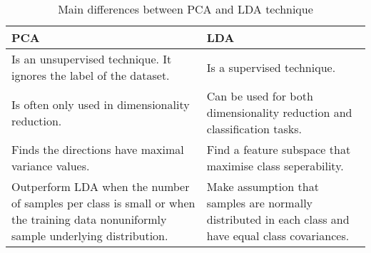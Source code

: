 \begin{table}[!th]
	\centering
	
	\begin{tabularx}{1.0\textwidth}{ XX }
	
	\toprule
	\textbf{PCA} & \textbf{LDA} \\
	
	\midrule

	\tabitem Is an unsupervised technique. It ignores the label of the dataset. & \tabitem Is a supervised technique. \\
	\tabitem Is often only used in dimensionality reduction. & \tabitem Can be used for both dimensionality reduction and classification tasks. \\
	\tabitem Finds the directions have maximal variance values. & \tabitem Find a feature subspace that maximise class seperability. \\
	\tabitem Outperform LDA when the number of samples per class is small or when the training data nonuniformly sample underlying distribution. \cite{Martinez2001} & \tabitem Make assumption that samples are normally distributed in each class and have equal class covariances. \cite{Martinez2001} \\	
	
	\bottomrule
	\end{tabularx}
	
	\caption{Main differences between PCA and LDA technique}
	\label{tab:PCA1}
\end{table}
